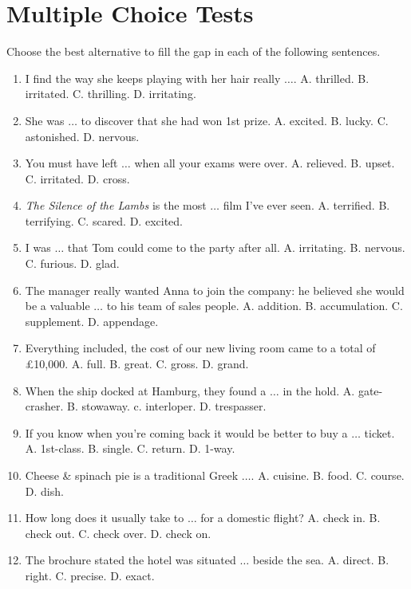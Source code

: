 \documentclass{article}
\numberwithin{equation}{section}
\begin{document}
\section{Multiple Choice Tests}
Choose the best alternative to fill the gap in each of the following sentences.
\begin{enumerate}[leftmargin=2mm]
	\item I find the way she keeps playing with her hair really $\ldots$. {\sf A.} thrilled. {\sf B.} irritated. {\sf C.} thrilling. {\sf D.} irritating.
	\item She was $\ldots$ to discover that she had won 1st prize. {\sf A.} excited. {\sf B.} lucky. {\sf C.} astonished. {\sf D.} nervous.
	\item You must have left $\ldots$ when all your exams were over. {\sf A.} relieved. {\sf B.} upset. {\sf C.} irritated. {\sf D.} cross.
	\item \textit{The Silence of the Lambs} is the most $\ldots$ film I've ever seen. {\sf A.} terrified. {\sf B.} terrifying. {\sf C.} scared. {\sf D.} excited.
	\item I was $\ldots$ that Tom could come to the party after all. {\sf A.} irritating. {\sf B.} nervous. {\sf C.} furious. {\sf D.} glad.
	\item The manager really wanted Anna to join the company: he believed she would be a valuable $\ldots$ to his team of sales people. {\sf A.} addition. {\sf B.} accumulation. {\sf C.} supplement. {\sf D.} appendage.
	\item Everything included, the cost of our new living room came to a total of \pounds10,000. {\sf A.} full. {\sf B.} great. {\sf C.} gross. {\sf D.} grand.
	\item When the ship docked at Hamburg, they found a $\ldots$ in the hold. {\sf A.} gate-crasher. {\sf B.} stowaway. c. interloper. {\sf D.} trespasser.
	\item If you know when you're coming back it would be better to buy a $\ldots$ ticket. {\sf A.} 1st-class. {\sf B.} single. {\sf C.} return. {\sf D.} 1-way.
	\item Cheese \& spinach pie is a traditional Greek $\ldots$. {\sf A.} cuisine. {\sf B.} food. {\sf C.} course. {\sf D.} dish.
	\item How long does it usually take to $\ldots$ for a domestic flight? {\sf A.} check in. {\sf B.} check out. {\sf C.} check over. {\sf D.} check on.
	\item The brochure stated the hotel was situated $\ldots$ beside the sea. {\sf A.} direct. {\sf B.} right. {\sf C.} precise. {\sf D.} exact.

\end{enumerate}
\end{document}
